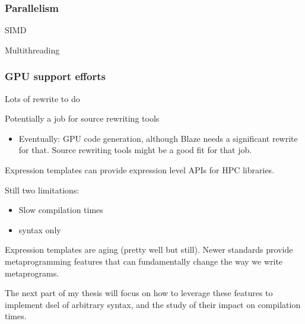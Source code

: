 \documentclass[../main]{subfiles}
\begin{document}
\subsubsection{
  Parallelism
}

SIMD

Multithreading

\subsubsection{
  GPU support efforts
}

Lots of rewrite to do

Potentially a job for source rewriting tools

\begin{itemize}
\item Eventually: GPU code generation, although Blaze needs a significant
      rewrite for that. Source rewriting tools might be a good fit for that job.
\end{itemize}

Expression templates can provide expression level APIs for HPC libraries.

Still two limitations:

\begin{itemize}
\item Slow compilation times
\item \cpp syntax only
\end{itemize}

Expression templates are aging (pretty well but still).
Newer \cpp standards provide metaprogramming features that can fundamentally
change the way we write metaprograms.

The next part of my thesis will focus on how to leverage these features to
implement \acrshort{dsel} of arbitrary syntax, and the study of their impact on
compilation times.
\end{document}
